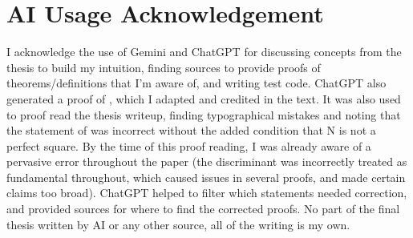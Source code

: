 \documentclass[honours,12pt]{unswthesis}
\numberwithin{equation}{section}
\begin{document}

\pagebreak
\chapter*{AI Usage Acknowledgement}
I acknowledge the use of Gemini and ChatGPT for discussing concepts from the thesis to build my intuition, finding sources to provide proofs of theorems/definitions that I’m aware of, and writing test code. 
ChatGPT also generated a proof of , which I adapted and credited in the text. 
It was also used to proof read the thesis writeup, finding typographical mistakes and noting that the statement of  was incorrect without the added condition that N is not a perfect square. 
By the time of this proof reading, I was already aware of a pervasive error throughout the paper (the discriminant was incorrectly treated as fundamental throughout, which caused issues in several proofs, and made certain claims too broad). 
ChatGPT helped to filter which statements needed correction, and provided sources for where to find the corrected proofs. 
No part of the final thesis written by AI or any other source, all of the writing is my own. 

\pagebreak


\end{document}

